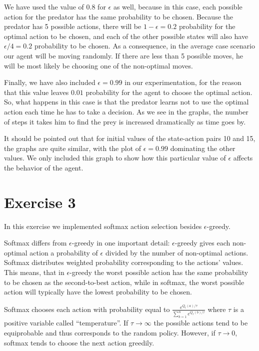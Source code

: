 \documentclass[a4paper,11pt]{article}
\begin{document}
We have used the value of 0.8 for $\epsilon$ as well, because in this case, each possible action for the predator has the same probability to be chosen. Because the predator has 5 possible actions, there will be $1-\epsilon = 0.2$ probability for the optimal action to be chosen, and each of the other possible states will also have $\epsilon /4 = 0.2$ probability to be chosen. As a consequence, in the average case scenario our agent will be moving randomly. If there are less than 5 possible moves, he will be most likely be choosing one of the non-optimal moves.


Finally, we have also included $\epsilon = 0.99$ in our experimentation, for the reason that this value leaves $0.01$ probability for the agent to choose the optimal action. So, what happens in this case is that the predator learns not to use the optimal action each time he has to take a decision. As we see in the graphs, the number of steps it takes him to find the prey is increased dramatically as time goes by.


It should be pointed out that for initial values of the state-action pairs 10 and 15, the graphs are quite similar, with the plot of $\epsilon = 0.99$ dominating the other values. We only included this graph to show how this particular value of $\epsilon$ affects the behavior of the agent.





\section*{Exercise 3}

In this exercise we implemented softmax action selection besides $\epsilon$-greedy. 

Softmax differs from $\epsilon$-greedy in one important detail: $\epsilon$-greedy gives each non-optimal action a probability of $\epsilon$ divided by the number of non-optimal actions.  Softmax distributes weighted probability corresponding to the actions' values. This means, that in $\epsilon$-greedy the worst possible action has the same probability to be chosen as the second-to-best action, while in softmax, the worst possible action will typically have the lowest probability to be chosen.

Softmax chooses each action with probability equal to $\frac{e^{Q_t(a)/ \tau}}{\sum^n_{b=1} e^{Q_t(b)/ \tau}}$
where $\tau$ is a positive variable called ``temperature''. If $\tau \rightarrow \infty$ the possible actions tend to be equiprobable and thus corresponds to the random policy. However, if $\tau \rightarrow 0$, softmax tends to choose the next action greedily.
\end{document}
